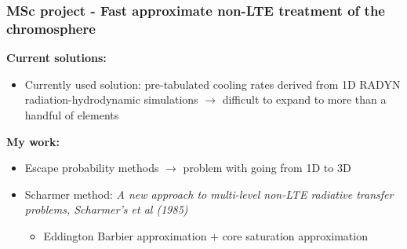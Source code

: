 


\frame
{
	\frametitle{MSc project - Fast approximate non-LTE treatment of the chromosphere}
	\large{\textbf{Current solutions:}}
	\begin{itemize}
		\item Currently used solution: pre-tabulated cooling rates derived from 1D RADYN radiation-hydrodynamic simulations \pause \alert{$\rightarrow$} difficult to expand to more than a handful of elements \\[10pt] \pause
	\end{itemize}
		\large{\textbf{My work:}}
		\begin{itemize}
		\item Escape probability methods \pause \alert{$\rightarrow$} problem with going from 1D to 3D \\[5pt] \pause
		\item Scharmer method: \textit{A new approach to multi-level non-LTE radiative transfer problems, Scharmer's et al (1985)} \\[2pt] 
		    \begin{itemize}
		        \item \large{Eddington Barbier approximation + core saturation approximation}
		    \end{itemize}
	    \end{itemize}
}




